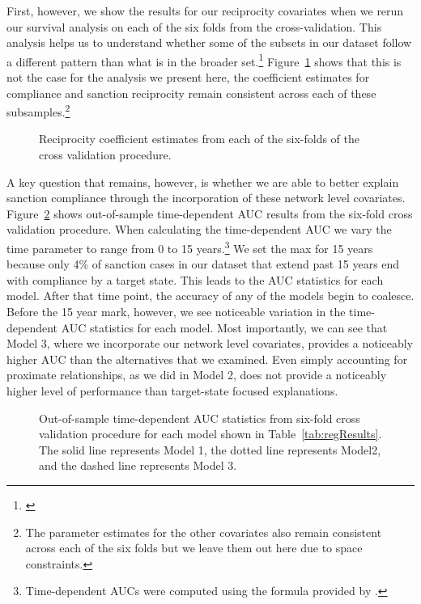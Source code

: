First, however, we show the results for our reciprocity covariates when we rerun our survival analysis on each of the six folds from the cross-validation. This analysis helps us to understand whether some of the subsets in our dataset follow a different pattern than what is in the broader set.\footnote{\cite{beck2008time}} Figure~\ref{fig:crossval} shows that this is not the case for the analysis we present here, the coefficient estimates for compliance and sanction reciprocity remain consistent across each of these subsamples.\footnote{The parameter estimates for the other covariates also remain consistent across each of the six folds but we leave them out here due to space constraints.}


\begin{figure}[ht]
	\centering
	\caption{Reciprocity coefficient estimates from each of the six-folds of the cross validation procedure.}
	\resizebox{1\textwidth}{!}{}
	\label{fig:crossval}
\end{figure}


A key question that remains, however, is whether we are able to better explain sanction compliance through the incorporation of these network level covariates. Figure~\ref{fig:auc} shows out-of-sample time-dependent AUC results from the six-fold cross validation procedure. When calculating the time-dependent AUC we vary the time parameter to range from 0 to 15 years.\footnote{Time-dependent AUCs were computed using the formula provided by \citet{chambless2006estimation}.} We set the max for 15 years because only 4\% of sanction cases in our dataset that extend past 15 years end with compliance by a target state. This leads to the AUC statistics for each model. After that time point, the accuracy of any of the models begin to coalesce. Before the 15 year mark, however, we see noticeable variation in the time-dependent AUC statistics for each model. Most importantly, we can see that Model 3, where we incorporate our network level covariates, provides a noticeably higher AUC than the alternatives that we examined. Even simply accounting for proximate relationships, as we did in Model 2, does not provide a noticeably higher level of performance than target-state focused explanations.

\begin{figure}[ht]
	\centering
	\caption{Out-of-sample time-dependent AUC statistics from six-fold cross validation procedure for each model shown in Table~\ref{tab:regResults}. The solid line represents Model 1, the dotted line represents Model2, and the dashed line represents Model 3.}
	\resizebox{0.8\textwidth}{!}{}
	\label{fig:auc}
\end{figure}